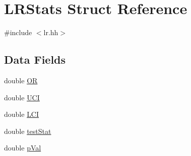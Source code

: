 \hypertarget{structLRStats}{
\section{LRStats Struct Reference}
\label{structLRStats}
}


{\ttfamily \#include $<$lr.hh$>$}

\subsection*{Data Fields}
\begin{DoxyCompactItemize}
\item 
double \hyperlink{structLRStats_ad2dc69ad8ef363196f7e1eb518d2749f}{OR}
\item 
double \hyperlink{structLRStats_a732a4d2d532d710c0eebbd55a5ea1cd4}{UCI}
\item 
double \hyperlink{structLRStats_a7a5645105fa178c1ae07ea41ce7265a7}{LCI}
\item 
double \hyperlink{structLRStats_a56946d63e769f7028683ce7899edd568}{testStat}
\item 
double \hyperlink{structLRStats_ab9c060dd747842d661d3ac3d3e7e7d8a}{pVal}
\end{DoxyCompactItemize}


